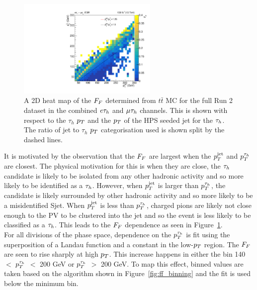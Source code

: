 \begin{figure}[!hbtp]
\centering
    \includegraphics[width=0.6\textwidth]{Figures/ff_colz_ttbar_lt_v2.pdf}
\caption[Plot of the reliance of the fake factors on the ratio of the $\tauh$ and jet $\pT$.]{A 2D heat map of the $F_{F}$ determined from $t\bar{t}$ MC for the full Run 2 dataset in the combined $e\tau_{h}$ and $\mu\tau_{h}$ channels. This is shown with respect to the $\tau_h$ $\pT$ and the $\pT$ of the HPS seeded jet for the $\tauh$. The ratio of jet to $\tau_h$ $\pT$ categorisation used is shown split by the dashed lines.}
\label{fig:ff_colz}
\end{figure}

It is motivated by the observation that the $F_{F}$ are largest when the $p_{T}^{\text{jet}}$ and $p_{T}^{\tau_{h}}$ are closest.
The physical motivation for this is when they are close, the $\tauh$ candidate is likely to be isolated from any other hadronic activity and so more likely to be identified as a $\tauh$.
However, when $p_{T}^{\text{jet}}$ is larger than $p_{T}^{\tau_{h}}$, the candidate is likely surrounded by other hadronic activity and so more likely to be a misidentified Sjet.
When $p_{T}^{\text{jet}}$ is less than $p_{T}^{\tau_{h}}$, charged pions are likely not close enough to the \ac{PV} to be clustered into the jet and so the event is less likely to be classified as a $\tauh$. 
This leads to the $F_{F}$ dependence as seen in Figure~\ref{fig:ff_colz}.\\

For all divisions of the phase space, dependence on the $p_{T}^{\tau_{h}}$ is fit using the superposition of a Landau function and a constant in the low-$\pT$ region.
The $F_{F}$ are seen to rise sharply at high $\pT$.
This increase happens in either the bin 140 $<$ $p_{T}^{\tau_{h}}$ $<$ 200 GeV or $p_{T}^{\tau_{h}}$ $>$ 200 GeV.
To map this effect, binned values are taken based on the algorithm shown in Figure~\ref{fig:ff_binning} and the fit is used below the minimum bin. \\


